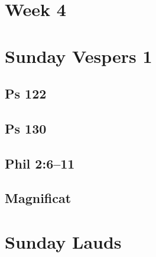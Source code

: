 

\section{Week 4}


\section{Sunday Vespers 1}

\subsection{Ps 122}

{%
\parindent 0pt
\noindent
\ifx\preLilyPondExample \undefined
\else
  \expandafter\preLilyPondExample
\fi
\def\lilypondbook{}%

\ifx\postLilyPondExample \undefined
\else
  \expandafter\postLilyPondExample
\fi
}

\subsection{Ps 130}

{%
\parindent 0pt
\noindent
\ifx\preLilyPondExample \undefined
\else
  \expandafter\preLilyPondExample
\fi
\def\lilypondbook{}%

\ifx\postLilyPondExample \undefined
\else
  \expandafter\postLilyPondExample
\fi
}

\subsection{Phil 2:6--11}

{%
\parindent 0pt
\noindent
\ifx\preLilyPondExample \undefined
\else
  \expandafter\preLilyPondExample
\fi
\def\lilypondbook{}%

\ifx\postLilyPondExample \undefined
\else
  \expandafter\postLilyPondExample
\fi
}

\subsection{Magnificat}

{%
\parindent 0pt
\noindent
\ifx\preLilyPondExample \undefined
\else
  \expandafter\preLilyPondExample
\fi
\def\lilypondbook{}%

\ifx\postLilyPondExample \undefined
\else
  \expandafter\postLilyPondExample
\fi
}


\section{Sunday Lauds}

